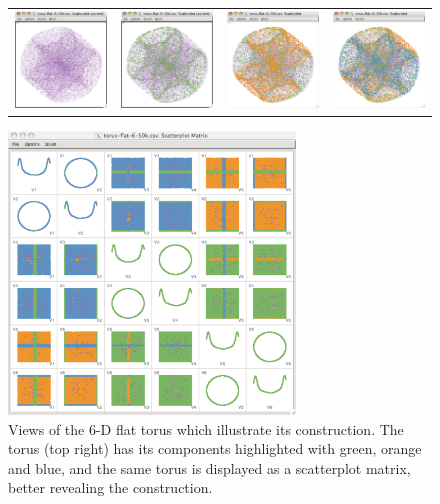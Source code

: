 \begin{figure}[ht]
  \centering
    \begin{tabular}{cccc}
    \includegraphics[width=1.2in]{fig/torus-flat-6-0.pdf} &
      \includegraphics[width=1.2in]{fig/torus-flat-6-1.pdf} &
    \includegraphics[width=1.2in]{fig/torus-flat-6-2.pdf} &
      \includegraphics[width=1.2in]{fig/torus-flat-6-3.pdf}
    \end{tabular}
    \includegraphics[width=3in]{fig/torus-flat-6-matrix.pdf}
  \caption{Views of the 6-D flat torus which illustrate its
    construction. The torus (top right) has its components highlighted with green, orange and blue, and the same torus is displayed as a scatterplot matrix, better revealing the construction. }
  \label{flat2}
\end{figure}

